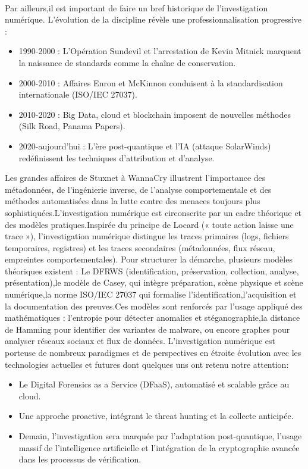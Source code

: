 \documentclass[12pt,a4paper]{article}
\begin{document}
{{ \paragraph{}
Par ailleurs,il est important de faire un bref historique de l’investigation numérique. L’évolution de la discipline révèle une professionnalisation progressive :
\begin{itemize}
    \item 1990-2000 : L’Opération Sundevil et l’arrestation de Kevin Mitnick marquent la naissance de standards comme la chaîne de conservation.
    \item 2000-2010 : Affaires Enron et McKinnon conduisent à la standardisation internationale (ISO/IEC 27037).
    \item 2010-2020 : Big Data, cloud et blockchain imposent de nouvelles méthodes (Silk Road, Panama Papers).
    \item 2020-aujourd’hui : L’ère post-quantique et l’IA (attaque SolarWinds) redéfinissent les techniques d’attribution et d’analyse.

\end{itemize}
Les grandes affaires de Stuxnet à WannaCry illustrent l’importance des métadonnées, de l’ingénierie inverse, de l’analyse comportementale et des méthodes automatisées dans la lutte contre des menaces toujours plus sophistiquées.L'investigation numérique est circonscrite par un cadre théorique et des modèles pratiques.Inspirée du principe de Locard (« toute action laisse une trace »), l’investigation numérique distingue les traces primaires (logs, fichiers temporaires, registres) et les traces secondaires (métadonnées, flux réseau, empreintes comportementales). Pour structurer la démarche, plusieurs modèles théoriques existent : Le DFRWS (identification, préservation, collection, analyse, présentation),le modèle de Casey, qui intègre préparation, scène physique et scène numérique,la norme ISO/IEC 27037 qui formalise l'identification,l'acquisition et la documentation des preuves.Ces modèles sont renforcés par l’usage appliqué des mathématiques : l'entropie pour détecter anomalies et stéganographie,la distance de Hamming pour identifier des variantes de malware, ou encore graphes pour analyser réseaux sociaux et flux de données. L'investigation numérique est porteuse de nombreux paradigmes et de perspectives en étroite évolution avec les technologies actuelles et futures dont quelques uns ont retenu notre attention:
\begin{itemize}
    \item Le Digital Forensics as a Service (DFaaS), automatisé et scalable grâce au cloud.
    \item Une approche proactive, intégrant le threat hunting et la collecte anticipée.
    \item Demain, l’investigation sera marquée par l’adaptation post-quantique, l’usage massif de l’intelligence artificielle et l’intégration de la cryptographie avancée dans les processus de vérification.
\end{itemize}
}}
\end{document}
